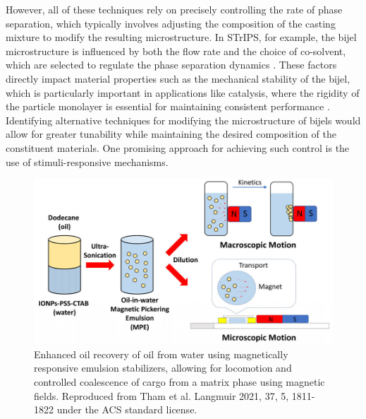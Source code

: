 However, all of these techniques rely on precisely controlling the rate of phase separation, which typically involves adjusting the composition 
of the casting mixture to modify the resulting microstructure. In STrIPS, for example, the bijel microstructure is influenced by both the flow rate 
and the choice of co-solvent, which are selected to regulate the phase separation dynamics \cite{haase_continuous_2015}. These factors directly 
impact material properties such as the mechanical stability of the bijel, which is particularly important in applications like catalysis, where the 
rigidity of the particle monolayer is essential for maintaining consistent performance 
\cite{reeves_particle-size_2015, haase_situ_2016, boakye-ansah_controlling_2020}. Identifying alternative techniques for modifying the microstructure of 
bijels would allow for greater tunability while maintaining the desired composition of the constituent materials. One promising approach for achieving 
such control is the use of stimuli-responsive mechanisms.  

\begin{figure}[h]
    \centering
    \includegraphics[scale = 1.5]{figures/introduction/magnetophoresis_emulsion.jpeg}
    \caption{Enhanced oil recovery of oil from water using magnetically responsive emulsion stabilizers, allowing for 
             locomotion and controlled coalescence of cargo from a matrix phase using magnetic fields. \cite{tham_magnetophoresis_2021} 
             Reproduced from Tham et al. Langmuir 2021, 37, 5, 1811-1822 under the ACS standard license.}
    \label{fig:magnetophoresis_droplet}
\end{figure}

